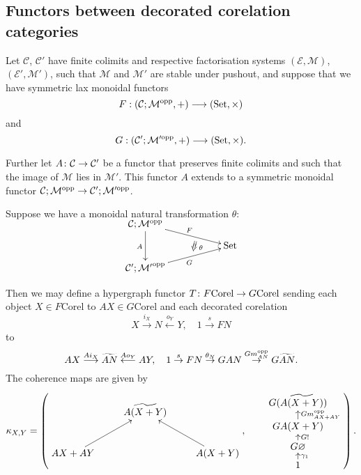\subsection{Functors between decorated corelation categories}

\begin{proposition}\label{prop.deccorelfunctors}
  Let $\mathcal C$, $\mathcal C'$ have finite colimits and respective
factorisation systems $(\mathcal E, \mathcal M)$, $(\mathcal E', \mathcal M')$,
such that $\mathcal M$ and $\mathcal M'$ are stable under pushout, and suppose
that we have symmetric lax monoidal functors
\[
  F: (\mathcal C;\mathcal M^{\mathrm{opp}},+) \longrightarrow (\mathrm{Set}, \times)
\]
and
\[
  G: (\mathcal C';\mathcal M'^{\mathrm{opp}},+) \longrightarrow (\mathrm{Set}, \times).
\]

Further let $A{\colon} \mathcal C \to \mathcal C'$ be a functor that preserves
finite colimits and such that the image of $\mathcal M$ lies in $\mathcal M'$.
This functor $A$ extends to a symmetric monoidal functor $\mathcal C;\mathcal M^{\mathrm{opp}} \to
\mathcal C';\mathcal M'^{\mathrm{opp}}$.

Suppose we have a monoidal natural transformation $\theta$:
\[
  \xymatrixrowsep{2ex}
  \xymatrix{
    \mc C; \mc M^\opp \ar[dd]_{A} \ar[drr]^F  \\
    &\twocell \omit{_\:\theta}& \Set \\
    \mc C'; \mc {M'}^\opp \ar[urr]_{G} 
  }
\]

Then we may define a hypergraph functor $T{\colon} F\mathrm{Corel} \to
G\mathrm{Corel}$ sending each object $X \in F\mathrm{Corel}$ to $AX \in
G\mathrm{Corel}$ and each decorated corelation 
\[
  X \stackrel{i_X}{\longrightarrow} N \stackrel{o_Y}{\longleftarrow} Y, \quad
  1 \stackrel{s}{\to} FN
\]
to
\[
  AX \stackrel{Ai_X}{\longrightarrow} \widetilde{AN} \stackrel{Ao_Y}{\longleftarrow} AY,
  \quad 1 \stackrel{s}{\to} FN \stackrel{\theta_N}{\to} GAN
  \stackrel{Gm_{AN}^{\mathrm{opp}}}{\to} G\widetilde{AN}.	
\]
The coherence maps are given by
\[
  \kappa_{X,Y}=          
  \left(
  \begin{aligned}
    \xymatrix{
      & \widetilde{A(X+Y)} \\  
      AX+AY \ar[ur] && A(X+Y) \ar[ul]
    }
  \end{aligned}
  ,
  \qquad
  \begin{aligned}
    \xymatrixrowsep{1.4ex}
    \xymatrix{
      G(\widetilde{A(X+Y)}) \\
      GA(X+Y) \ar[u]_{Gm_{AX+AY}^\opp} \\
      G\varnothing \ar[u]_{G!} \\
      1 \ar[u]_{\gamma_1}
    }
  \end{aligned}
  \right).
\]
\end{proposition}
